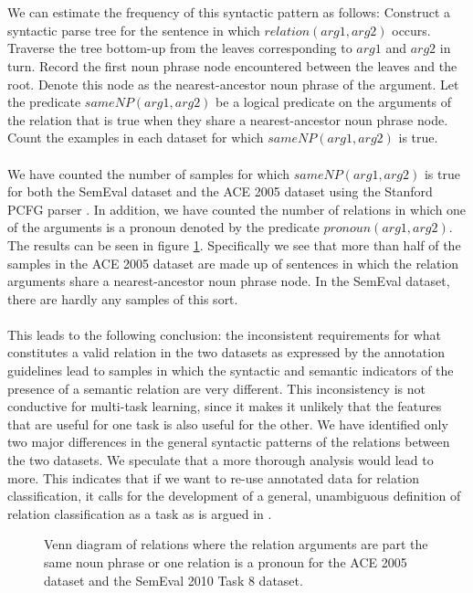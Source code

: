 \\\\
We can estimate the frequency of this syntactic pattern as follows: Construct a syntactic parse tree for the sentence in which $relation(arg1,arg2)$ occurs. Traverse the tree bottom-up from the leaves corresponding to $arg1$ and $arg2$ in turn. Record the first noun phrase node encountered between the leaves and the root. Denote this node as the nearest-ancestor noun phrase of the argument. Let the predicate $sameNP(arg1, arg2)$ be a logical predicate on the arguments of the relation that is true when they share a nearest-ancestor noun phrase node. Count the examples in each dataset for which $sameNP(arg1, arg2)$ is true.
\\\\
We have counted the number of samples for which $sameNP(arg1,arg2)$ is true for both the SemEval dataset and the ACE 2005 dataset using the Stanford PCFG parser \citep{klein2003}. In addition, we have counted the number of relations in which one of the arguments is a pronoun denoted by the predicate $pronoun(arg1,arg2)$. The results can be seen in figure \ref{same_noun_phrase}. Specifically we see that more than half of the samples in the ACE 2005 dataset are made up of sentences in which the relation arguments share a nearest-ancestor noun phrase node. In the SemEval dataset, there are hardly any samples of this sort.
\\\\
This leads to the following conclusion: the inconsistent requirements for what constitutes a valid relation in the two datasets as expressed by the annotation guidelines lead to samples in which the syntactic and semantic indicators of the presence of a semantic relation are very different. This inconsistency is not conductive for multi-task learning, since it makes it unlikely that the features that are useful for one task is also useful for the other. We have identified only two major differences in the general syntactic patterns of the relations between the two datasets. We speculate that a more thorough analysis would lead to more. This indicates that if we want to re-use annotated data for relation classification, it calls for the development of a general, unambiguous definition of relation classification as a task as is argued in \cite{handschuh2016}.
\newpage
\begin{figure}[h!]
	\centering
	
	
	\vspace{1cm}
	
	
	\caption{Venn diagram of relations where the relation arguments are part the same noun phrase or one relation is a pronoun for the ACE 2005 dataset and the SemEval 2010 Task 8 dataset.}
	\label{same_noun_phrase}
\end{figure}
